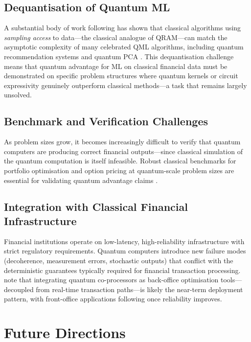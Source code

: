 \documentclass[12pt,a4paper]{article}
\begin{document}
\subsection{Dequantisation of Quantum ML}

A substantial body of work following \citet{biamonte_quantum_2017} has shown that classical algorithms using \emph{sampling access} to data---the classical analogue of QRAM---can match the asymptotic complexity of many celebrated QML algorithms, including quantum recommendation systems and quantum PCA \citep{herman_quantum_2023}. This dequantisation challenge means that quantum advantage for ML on classical financial data must be demonstrated on specific problem structures where quantum kernels or circuit expressivity genuinely outperform classical methods---a task that remains largely unsolved.

\subsection{Benchmark and Verification Challenges}

As problem sizes grow, it becomes increasingly difficult to verify that quantum computers are producing correct financial outputs---since classical simulation of the quantum computation is itself infeasible. Robust classical benchmarks for portfolio optimisation and option pricing at quantum-scale problem sizes are essential for validating quantum advantage claims \citep{preskill_quantum_2018, gong_quantum_2026-1}.

\subsection{Integration with Classical Financial Infrastructure}

Financial institutions operate on low-latency, high-reliability infrastructure with strict regulatory requirements. Quantum computers introduce new failure modes (decoherence, measurement errors, stochastic outputs) that conflict with the deterministic guarantees typically required for financial transaction processing. \citet{auer_quantum_2024} note that integrating quantum co-processors as back-office optimisation tools---decoupled from real-time transaction paths---is likely the near-term deployment pattern, with front-office applications following once reliability improves.

\section{Future Directions}
\label{sec:future}
\end{document}
